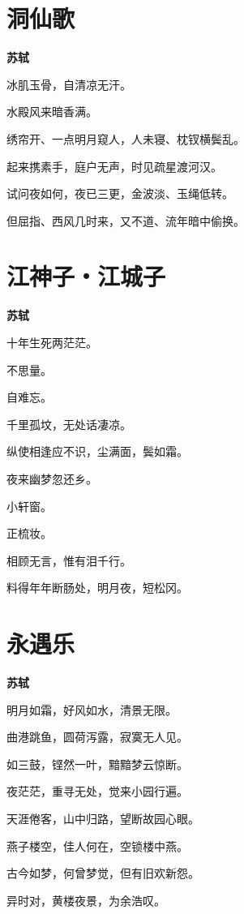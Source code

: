 \documentclass[12pt,a4paper]{ctexbook}
\begin{document}
\section{洞仙歌}
\textbf{苏轼}\par\vspace{0.5em}
冰肌玉骨，自清凉无汗。\par
水殿风来暗香满。\par
绣帘开、一点明月窥人，人未寝、枕钗横鬓乱。\par
起来携素手，庭户无声，时见疏星渡河汉。\par
试问夜如何，夜已三更，金波淡、玉绳低转。\par
但屈指、西风几时来，又不道、流年暗中偷换。\par

\section{江神子・江城子}
\textbf{苏轼}\par\vspace{0.5em}
十年生死两茫茫。\par
不思量。\par
自难忘。\par
千里孤坟，无处话凄凉。\par
纵使相逢应不识，尘满面，鬓如霜。\par
夜来幽梦忽还乡。\par
小轩窗。\par
正梳妆。\par
相顾无言，惟有泪千行。\par
料得年年断肠处，明月夜，短松冈。\par

\section{永遇乐}
\textbf{苏轼}\par\vspace{0.5em}
明月如霜，好风如水，清景无限。\par
曲港跳鱼，圆荷泻露，寂寞无人见。\par
如三鼓，铿然一叶，黯黯梦云惊断。\par
夜茫茫，重寻无处，觉来小园行遍。\par
天涯倦客，山中归路，望断故园心眼。\par
燕子楼空，佳人何在，空锁楼中燕。\par
古今如梦，何曾梦觉，但有旧欢新怨。\par
异时对，黄楼夜景，为余浩叹。\par
\end{document}
